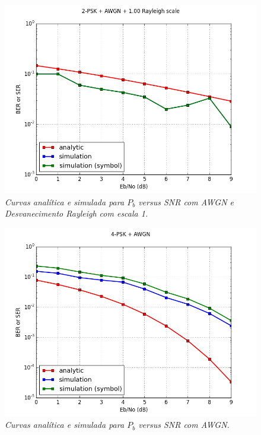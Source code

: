 \documentclass[a4paper,twocolumn]{article}
\begin{document}
\begin{figure}[h]
    \label{fig:2-psk_awgn_100_rayleigh}
    \centering
    \includegraphics[scale=0.40]{2-psk_awgn_100_rayleigh}
    \caption{\textit{Curvas analítica e simulada para $P_b$ versus SNR com AWGN e Desvanecimento Rayleigh com escala 1.}}
\end{figure}

\begin{figure}[h]
    \label{fig:4-psk_awgn}
    \centering
    \includegraphics[scale=0.40]{4-psk_awgn}
    \caption{\textit{Curvas analítica e simulada para $P_b$ versus SNR com AWGN.}}
\end{figure}
\end{document}
